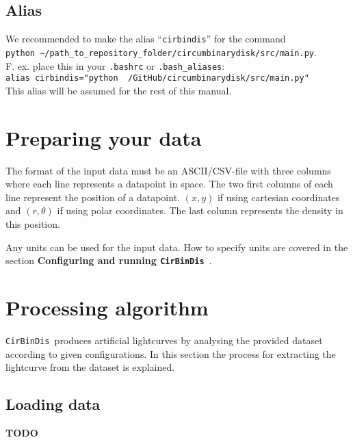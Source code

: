 \documentclass[a4paper, 12pt, english, titlepage]{article}
\newcommand{\sname}{\texttt{CirBinDis }}
\begin{document}
\subsection{Alias}
    We recommended to make the alias ``\texttt{cirbindis}'' for the command \\
    \texttt{python \textasciitilde/path\_to\_repository\_folder/circumbinarydisk/src/main.py}. \\
    F. ex. place this in your \texttt{.bashrc} or \texttt{.bash\_aliases}: \\
    \texttt{alias cirbindis="python ~/GitHub/circumbinarydisk/src/main.py"} \\
    This alias will be assumed for the rest of this manual.


\section{Preparing your data}

The format of the input data must be an ASCII/CSV-file with three columns where each line represents a datapoint in space. The two first columns of each line represent the position of a datapoint. $(x, y)$ if using cartesian coordinates and $(r, \theta)$ if using polar coordinates. The last column represents the density in this position.

Any units can be used for the input data. How to specify units are covered in the section \textbf{Configuring and running \sname}.


\section{Processing algorithm}

\sname produces artificial lightcurves by analysing the provided dataset according to given configurations. In this section the process for extracting the lightcurve from the dataset is explained.

\subsection{Loading data}
    \textbf{TODO}
\end{document}
